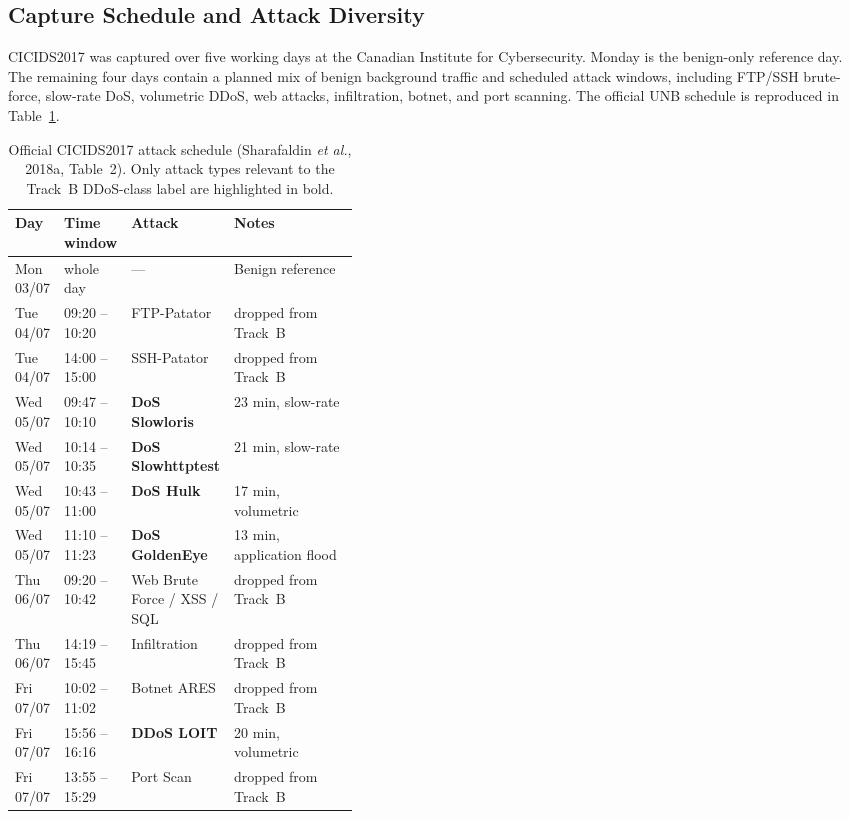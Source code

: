 \documentclass[12pt, a4paper, reqno, oneside]{book}
\begin{document}
\subsection{Capture Schedule and Attack Diversity}
\label{subsec:cicids2017-schedule}

CICIDS2017 was captured over five working days at the Canadian Institute for
Cybersecurity. Monday is the benign-only reference day. The remaining four
days contain a planned mix of benign background traffic and scheduled attack
windows, including FTP/SSH brute-force, slow-rate DoS, volumetric DDoS, web
attacks, infiltration, botnet, and port scanning. The official UNB schedule
is reproduced in Table~\ref{tab:cicids2017-schedule}.

\begin{table}[htbp]
\centering
\small
\caption{Official CICIDS2017 attack schedule (Sharafaldin \textit{et al.},
2018a, Table~2). Only attack types relevant to the Track~B DDoS-class label
are highlighted in bold.}
\label{tab:cicids2017-schedule}
\begin{tabular}{@{}lllp{0.40\linewidth}@{}}
\toprule
Day & Time window & Attack & Notes \\
\midrule
Mon 03/07 & whole day      & ---                       & Benign reference \\
Tue 04/07 & 09:20 -- 10:20 & FTP-Patator               & dropped from Track~B \\
Tue 04/07 & 14:00 -- 15:00 & SSH-Patator               & dropped from Track~B \\
Wed 05/07 & 09:47 -- 10:10 & \textbf{DoS Slowloris}    & 23 min, slow-rate \\
Wed 05/07 & 10:14 -- 10:35 & \textbf{DoS Slowhttptest} & 21 min, slow-rate \\
Wed 05/07 & 10:43 -- 11:00 & \textbf{DoS Hulk}         & 17 min, volumetric \\
Wed 05/07 & 11:10 -- 11:23 & \textbf{DoS GoldenEye}    & 13 min, application flood \\
Thu 06/07 & 09:20 -- 10:42 & Web Brute Force / XSS / SQL & dropped from Track~B \\
Thu 06/07 & 14:19 -- 15:45 & Infiltration              & dropped from Track~B \\
Fri 07/07 & 10:02 -- 11:02 & Botnet ARES               & dropped from Track~B \\
Fri 07/07 & 15:56 -- 16:16 & \textbf{DDoS LOIT}        & 20 min, volumetric \\
Fri 07/07 & 13:55 -- 15:29 & Port Scan                 & dropped from Track~B \\
\bottomrule
\end{tabular}
\end{table}
\end{document}
